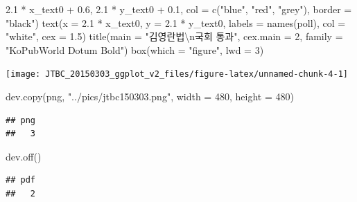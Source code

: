 \documentclass[
]{article}
\newenvironment{Shaded}{\begin{snugshade}}{\end{snugshade}}
\newcommand{\AttributeTok}[1]{\textcolor[rgb]{0.77,0.63,0.00}{#1}}
\newcommand{\DecValTok}[1]{\textcolor[rgb]{0.00,0.00,0.81}{#1}}
\newcommand{\FloatTok}[1]{\textcolor[rgb]{0.00,0.00,0.81}{#1}}
\newcommand{\FunctionTok}[1]{\textcolor[rgb]{0.00,0.00,0.00}{#1}}
\newcommand{\NormalTok}[1]{#1}
\newcommand{\SpecialCharTok}[1]{\textcolor[rgb]{0.00,0.00,0.00}{#1}}
\newcommand{\StringTok}[1]{\textcolor[rgb]{0.31,0.60,0.02}{#1}}
\begin{document}
\begin{Shaded}
\begin{Highlighting}[]
     \FloatTok{2.1} \SpecialCharTok{*}\NormalTok{ x\_text0 }\SpecialCharTok{+} \FloatTok{0.6}\NormalTok{, }\FloatTok{2.1} \SpecialCharTok{*}\NormalTok{ y\_text0 }\SpecialCharTok{+} \FloatTok{0.1}\NormalTok{,}
     \AttributeTok{col =} \FunctionTok{c}\NormalTok{(}\StringTok{"blue"}\NormalTok{, }\StringTok{"red"}\NormalTok{, }\StringTok{"grey"}\NormalTok{),}
     \AttributeTok{border =} \StringTok{"black"}\NormalTok{)}
\FunctionTok{text}\NormalTok{(}\AttributeTok{x =} \FloatTok{2.1} \SpecialCharTok{*}\NormalTok{ x\_text0, }\AttributeTok{y =} \FloatTok{2.1} \SpecialCharTok{*}\NormalTok{ y\_text0, }
     \AttributeTok{labels =} \FunctionTok{names}\NormalTok{(poll), }
     \AttributeTok{col =} \StringTok{"white"}\NormalTok{, }
     \AttributeTok{cex =} \FloatTok{1.5}\NormalTok{)}
\FunctionTok{title}\NormalTok{(}\AttributeTok{main =} \StringTok{"김영란법}\SpecialCharTok{\textbackslash{}n}\StringTok{국회 통과"}\NormalTok{, }\AttributeTok{cex.main =} \DecValTok{2}\NormalTok{, }\AttributeTok{family =} \StringTok{"KoPubWorld Dotum Bold"}\NormalTok{)}
\FunctionTok{box}\NormalTok{(}\AttributeTok{which =} \StringTok{"figure"}\NormalTok{, }\AttributeTok{lwd =} \DecValTok{3}\NormalTok{)}
\end{Highlighting}
\end{Shaded}

\begin{center}\texttt{[image: JTBC\_20150303\_ggplot\_v2\_files/figure-latex/unnamed-chunk-4-1]} \end{center}

\begin{Shaded}
\begin{Highlighting}[]
\FunctionTok{dev.copy}\NormalTok{(png, }\StringTok{"../pics/jtbc150303.png"}\NormalTok{, }\AttributeTok{width =} \DecValTok{480}\NormalTok{, }\AttributeTok{height =} \DecValTok{480}\NormalTok{)}
\end{Highlighting}
\end{Shaded}

\begin{verbatim}
## png 
##   3
\end{verbatim}

\begin{Shaded}
\begin{Highlighting}[]
\FunctionTok{dev.off}\NormalTok{()}
\end{Highlighting}
\end{Shaded}

\begin{verbatim}
## pdf 
##   2
\end{verbatim}
\end{document}
